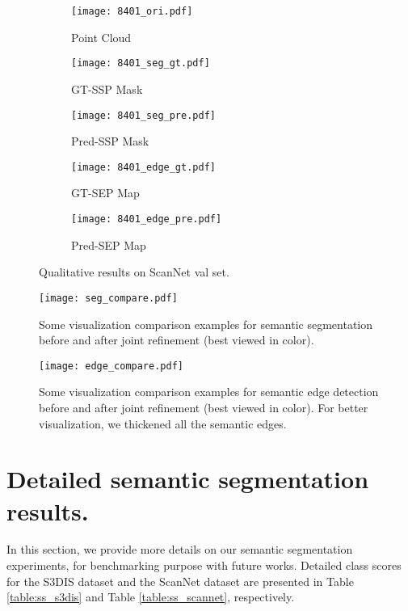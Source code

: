\documentclass[runningheads]{llncs}
\begin{document}
\begin{figure}
\begin{subfigure}{.193\textwidth}
  \centering
  \texttt{[image: 8401\_ori.pdf]}
  \caption{Point Cloud}
\end{subfigure} \hfil
\begin{subfigure}{.193\textwidth}
  \centering
  \texttt{[image: 8401\_seg\_gt.pdf]}
  \caption{GT-SSP Mask}
\end{subfigure} \hfil
\begin{subfigure}{.193\textwidth}
  \centering
  \texttt{[image: 8401\_seg\_pre.pdf]}
  \caption{Pred-SSP Mask}
\end{subfigure} \hfil
\begin{subfigure}{.193\textwidth}
  \centering
  \texttt{[image: 8401\_edge\_gt.pdf]}
  \caption{GT-SEP Map}
\end{subfigure} \hfil
\begin{subfigure}{.193\textwidth}
  \centering
  \texttt{[image: 8401\_edge\_pre.pdf]}
  \caption{Pred-SEP Map}
\end{subfigure}

\caption{Qualitative results on ScanNet val set.}
\label{fig:qualitative_scannet}
\end{figure}


\begin{figure}[htp]

\centering
\texttt{[image: seg\_compare.pdf]}

\caption{ Some visualization comparison examples for semantic segmentation before and after joint refinement (best viewed in color).
}
\label{fig:seg_compare}

\end{figure}


\begin{figure}[htp]

\centering
\texttt{[image: edge\_compare.pdf]}

\caption{ Some visualization comparison examples for semantic edge detection before and after joint refinement (best viewed in color). For better visualization, we thickened all the semantic edges.
}
\label{fig:edge_compare}

\end{figure}




\clearpage


\section{Detailed semantic segmentation results.}\label{class_results}
In this section, we provide more details on our semantic segmentation experiments, for benchmarking purpose with future works. Detailed class scores for the S3DIS dataset and the ScanNet dataset are presented in Table \ref{table:ss_s3dis} and Table \ref{table:ss_scannet}, respectively. 
\end{document}
